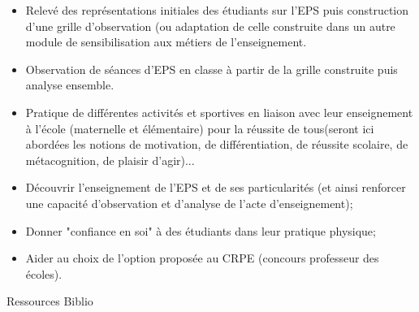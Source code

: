 \documentclass[10pt, a5paper]{report}
\begin{document}
\vfill


{
\begin{itemize}
\item Relevé des représentations initiales des étudiants sur l'EPS puis construction
d'une grille d'observation (ou adaptation de celle construite dans un autre module de sensibilisation aux métiers de l'enseignement.
\item Observation de séances d'EPS en classe à partir de la grille construite puis analyse ensemble.
\item Pratique de différentes activités et sportives en liaison avec leur enseignement à l'école (maternelle et élémentaire) pour la réussite de tous(seront ici abordées les notions de motivation, de différentiation, de réussite scolaire, de métacognition, de plaisir d'agir)...
\end{itemize}
} 
{}
{\begin{itemize}
\item Découvrir l'enseignement de l'EPS et de ses particularités (et ainsi renforcer une capacité d'observation et d'analyse de l'acte d'enseignement);
\item Donner "confiance en soi" à des étudiants dans leur pratique physique;
\item Aider au choix de l'option proposée au CRPE (concours professeur des écoles).
\end{itemize}
} 
{Ressources}
{Biblio}
 
\vfill

\end{document}
